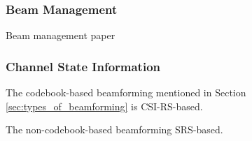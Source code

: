 



\subsubsection*{Beam Management} 
Beam management paper \cite{8947954}
\subsubsection*{Channel State Information}
The codebook-based beamforming mentioned in Section \ref{sec:types_of_beamforming} is CSI-RS-based.

The non-codebook-based beamforming SRS-based.




